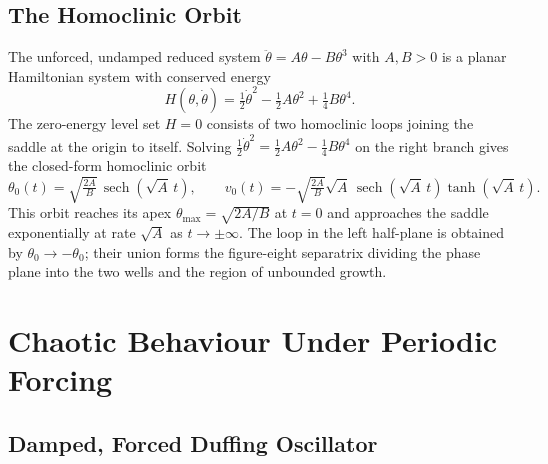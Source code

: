 \documentclass[11pt, a4paper]{article}
\newcommand{\sech}{\operatorname{sech}}
\begin{document}
\subsection{The Homoclinic Orbit}
\label{sec:homoclinic}

The unforced, undamped reduced system
$\ddot\theta = A\theta - B\theta^3$
with $A, B > 0$ is a planar Hamiltonian system with conserved energy
%
\begin{equation}
\label{eq:H-duffing}
H(\theta, \dot{\theta})
  = \tfrac{1}{2}\dot{\theta}^2 - \tfrac{1}{2}A\theta^2 + \tfrac{1}{4}B\theta^4.
\tag{22}
\end{equation}
%
The zero-energy level set $H = 0$ consists of two homoclinic loops joining the
saddle at the origin to itself.  Solving $\frac{1}{2}\dot\theta^2 =
\frac{1}{2}A\theta^2 - \frac{1}{4}B\theta^4$ on the right branch gives the
closed-form homoclinic orbit
%
\begin{equation}
\label{eq:homoclinic}
\boxed{
\theta_0(t)
  = \sqrt{\tfrac{2A}{B}}\,\sech(\sqrt{A}\,t),
\qquad
v_0(t)
  = -\sqrt{\tfrac{2A}{B}}\sqrt{A}\,\sech(\sqrt{A}\,t)\tanh(\sqrt{A}\,t).
}
\tag{23}
\end{equation}
%
This orbit reaches its apex $\theta_{\max} = \sqrt{2A/B}$ at $t = 0$ and
approaches the saddle exponentially at rate $\sqrt{A}$ as $t \to \pm\infty$.
The loop in the left half-plane is obtained by $\theta_0 \to -\theta_0$; their
union forms the figure-eight separatrix dividing the phase plane into the two
wells and the region of unbounded growth.


\section{Chaotic Behaviour Under Periodic Forcing}
\label{sec:chaos}

\subsection{Damped, Forced Duffing Oscillator}
\label{sec:forced}
\end{document}

